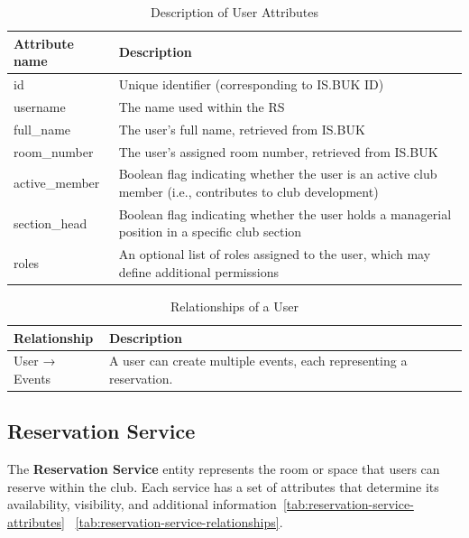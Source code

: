 \begin{table}[H]
  \centering
  \begin{tabularx}{\textwidth}{|l|X|}
  \hline
  \textbf{Attribute name} & \textbf{Description} \\
  \hline
  id & Unique identifier (corresponding to IS.BUK ID) \\
  \hline
  username & The name used within the RS \\
  \hline
  full\_name & The user's full name, retrieved from IS.BUK \\
  \hline
  room\_number & The user's assigned room number, retrieved from IS.BUK \\
  \hline
  active\_member & Boolean flag indicating whether the user is an active club member (i.e., contributes to club development) \\
  \hline
  section\_head & Boolean flag indicating whether the user holds a managerial position in a specific club section \\
  \hline
  roles & An optional list of roles assigned to the user, which may define additional permissions \\
  \hline
  \end{tabularx}
  \caption{Description of User Attributes}
  \label{tab:user-attributes}
  \end{table}

  \begin{table}[H]
    \centering
    \begin{tabularx}{\textwidth}{|l|X|}
    \hline
    \textbf{Relationship} & \textbf{Description} \\
    \hline
    User → Events & A user can create multiple events, each representing a reservation. \\
    \hline
    \end{tabularx}
    \caption{Relationships of a User}
    \label{tab:user-relationships}
  \end{table}

\subsection{Reservation Service}

The \textbf{Reservation Service} entity represents the room or space that users can reserve within the club. Each service has a set of attributes that determine its availability, visibility, and additional information~\ref{tab:reservation-service-attributes} ~\ref{tab:reservation-service-relationships}.

